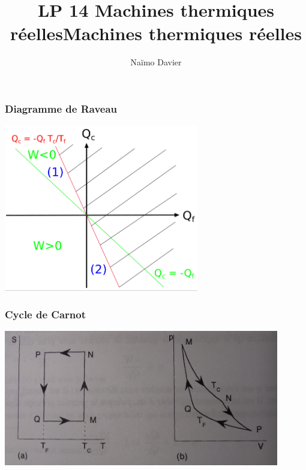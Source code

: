 \documentclass{beamer}
\title{LP 14 Machines thermiques réelles}
\author{Naïmo Davier}
\institute{Université Paul sabatier}
\begin{document}
	
\begin{frame}
	\titlepage
\end{frame}

\addtocounter{framenumber}{-1}
\title{Machines thermiques réelles}

\begin{frame}
\frametitle{Diagramme de Raveau}
\centerline{\includegraphics[width=8.5cm]{raveau}}
\end{frame}

\begin{frame}
\frametitle{Cycle de Carnot}
\centerline{\includegraphics[width=12cm]{cycle_carnot}}
\end{frame}
\end{document}
